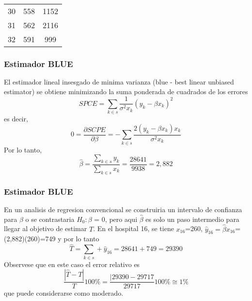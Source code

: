 ﻿\documentclass{beamer}
\begin{document}
\begin{frame}[allowframebreaks*]
\begin{tabular}{|c|c|c|}
                                                                                  30 & 558 & 1152 \\
                                                                                  31 & 562 & 2116 \\
                                                                                  32 & 591 & 999 \\
                                                                                  \hline
                                                                                \end{tabular}
\end{frame}

\begin{frame}[allowframebreaks*]
\frametitle{Estimador BLUE}
El estimador lineal insesgado de minima varianza (blue - best linear unbiased estimator) se obtiene minimizando la suma ponderada de cuadrados de los errores
\begin{equation*}
  SPCE = \sum\limits_{k \in s} \frac{1}{\sigma^2 x_k} (y_k - \beta x_k)^2
\end{equation*}
es decir,
\begin{equation*}
  0=\frac{\partial SCPE}{\partial \beta}= -\sum\limits_{k \in s}\frac{2(y_k - \beta x_k) x_k}{\sigma^2 x_k}
\end{equation*}
Por lo tanto,
\begin{equation*}
\hat{\beta}=\frac{\sum\limits_{k \in s} y_k}{\sum\limits_{k \in s} x_k}=\frac{28641}{9938}=2,882
\end{equation*}
\end{frame}

\begin{frame}[allowframebreaks*]
\frametitle{Estimador BLUE}
En un analisis de regresion convencional se construiria un intervalo de confianza para $\beta$ o se contrastaria $H_0: \beta$ = 0, pero aqui $\hat{\beta}$ es solo un paso intermedio para llegar al objetivo de estimar $T$. En el hospital 16, se tiene $x_{16}$=260, $\hat{y}_{16}=\hat{\beta} x_{16}$=(2,882)(260)=749 y por lo tanto
\begin{equation*}
  \hat{T}=\sum\limits_{k \in s}+\hat{y}_{16}=28641+749=29390
\end{equation*}
Observese que en este caso el error relativo es
\begin{equation*}
  \frac{|\hat{T}-T|}{T} 100\% =\frac{|29390-29717}{29717} 100\% \cong 1\%
\end{equation*}
que puede considerarse como moderado.
\end{frame}
\end{document}
